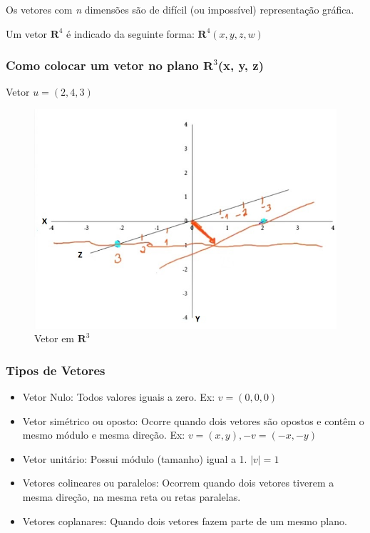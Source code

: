\documentclass[12pt]{article}
\begin{document}
Os vetores com \textit{n} dimensões são de difícil (ou impossível) representação gráfica.

Um vetor \( \mathbf{R}^{4} \) é indicado da seguinte forma: \( \mathbf{R}^{4} (x, y, z, w)\)

\subsubsection{Como colocar um vetor no plano \( \mathbf{R}^{3} \)(x, y, z)}

Vetor \(u = (2,4,3)\)

\begin{figure}[H]
	\centering
	\includegraphics[width=0.7\linewidth]{figuras/R3}
	\caption[Vetor em \( \mathbf{R}^{3} \)]{Vetor em \( \mathbf{R}^{3} \)}
	\label{fig:vetor r3}
\end{figure}

\subsubsection{Tipos de Vetores}

\begin{itemize}
	\item Vetor Nulo: Todos valores iguais a zero. Ex: \(v = (0,0,0)\)
	\item Vetor simétrico ou oposto: Ocorre quando dois vetores são opostos e contêm o mesmo módulo e mesma direção. Ex: \(v = (x,y), -v = (-x,-y)\)
	\item Vetor unitário: Possui módulo (tamanho) igual a 1. \(|v| = 1\)
	\item Vetores colineares ou paralelos: Ocorrem quando dois vetores tiverem a mesma direção, na mesma reta ou retas paralelas.
	\item Vetores coplanares: Quando dois vetores fazem parte de um mesmo plano.
		
\end{itemize}
\end{document}
